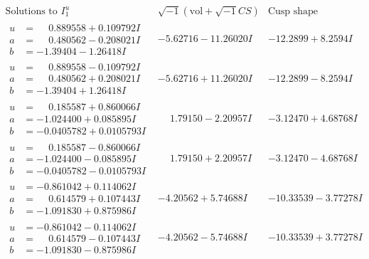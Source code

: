 \documentclass[1p]{elsarticle_modified}
\theoremstyle{definition}
\newcommand{\I}{\sqrt{-1}}
\begin{document}
$$\begin{array}{c|c|c}  
\text{Solutions to }I^u_{1}& \I (\text{vol} + \sqrt{-1}CS) & \text{Cusp shape}\\
 \hline 
\begin{aligned}
u &= \phantom{-}0.889558 + 0.109792 I \\
a &= \phantom{-}0.480562 - 0.208021 I \\
b &= -1.39404 - 1.26418 I\end{aligned}
 & -5.62716 - 11.26020 I & -12.2899 + 8.2594 I \\ \hline\begin{aligned}
u &= \phantom{-}0.889558 - 0.109792 I \\
a &= \phantom{-}0.480562 + 0.208021 I \\
b &= -1.39404 + 1.26418 I\end{aligned}
 & -5.62716 + 11.26020 I & -12.2899 - 8.2594 I \\ \hline\begin{aligned}
u &= \phantom{-}0.185587 + 0.860066 I \\
a &= -1.024400 + 0.085895 I \\
b &= -0.0405782 + 0.0105793 I\end{aligned}
 & \phantom{-}1.79150 - 2.20957 I & -3.12470 + 4.68768 I \\ \hline\begin{aligned}
u &= \phantom{-}0.185587 - 0.860066 I \\
a &= -1.024400 - 0.085895 I \\
b &= -0.0405782 - 0.0105793 I\end{aligned}
 & \phantom{-}1.79150 + 2.20957 I & -3.12470 - 4.68768 I \\ \hline\begin{aligned}
u &= -0.861042 + 0.114062 I \\
a &= \phantom{-}0.614579 + 0.107443 I \\
b &= -1.091830 + 0.875986 I\end{aligned}
 & -4.20562 + 5.74688 I & -10.33539 - 3.77278 I \\ \hline\begin{aligned}
u &= -0.861042 - 0.114062 I \\
a &= \phantom{-}0.614579 - 0.107443 I \\
b &= -1.091830 - 0.875986 I\end{aligned}
 & -4.20562 - 5.74688 I & -10.33539 + 3.77278 I \\ \hline\begin{aligned}

\end{aligned}
\end{array}$$
\end{document}
